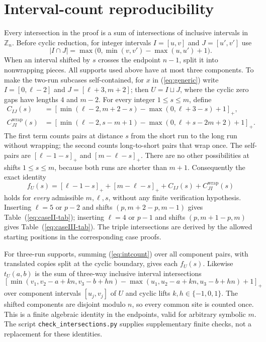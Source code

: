 \documentclass[11pt,a4paper]{article}
\newcommand{\wt}[1]{\lvert #1\rvert}
\newcommand{\cZ}{\mathbb Z}
\newcommand{\pos}[1]{[#1]_{+}}
\begin{document}
\appendix
\section{Interval-count reproducibility}\label{app:intervals}
Every intersection in the proof is a sum of intersections of inclusive intervals in $\cZ_n$. Before cyclic reduction, for integer intervals $I=[u,v]$ and $J=[u',v']$ use
\begin{equation}\label{eq:intcount}
\wt{I\cap J}=\max\big(0,\min(v,v')-\max(u,u')+1\big).
\end{equation}
When an interval shifted by $s$ crosses the endpoint $n-1$, split it into nonwrapping pieces. All supports used above have at most three components. To make the two-run subcases self-contained, for $x$ in (\ref{eq:generic}) write $I=[0,\ell-2]$ and $J=[\ell+3,m+2]$; then $U=I\sqcup J$, where the cyclic zero gaps have lengths $4$ and $m-2$. For every integer $1\le s\le m$, define
\begin{align}
 C_{IJ}(s)&=\pos{\min(\ell-2,m+2-s)-\max(0,\ell+3-s)+1},\\
 C_{JI}^{\mathrm{wrap}}(s)&=\pos{\min(\ell-2,s-m+1)-\max(0,\ell+s-2m+2)+1}.
\end{align}
The first term counts pairs at distance $s$ from the short run to the long run without wrapping; the second counts long-to-short pairs that wrap once. The self-pairs are $\pos{\ell-1-s}$ and $\pos{m-\ell-s}$. There are no other possibilities at shifts $1\le s\le m$, because both runs are shorter than $m+1$. Consequently the exact identity
\begin{equation}\label{eq:generic-f}
 f_U(s)=\pos{\ell-1-s}+\pos{m-\ell-s}+C_{IJ}(s)+C_{JI}^{\mathrm{wrap}}(s)
\end{equation}
holds for \emph{every} admissible $m,\ell,s$, without any finite verification hypothesis. Inserting $\ell=5$ or $p-2$ and shifts $(p,m+2-p,m-1)$ gives Table~(\ref{eq:caseII-tab}); inserting $\ell=4$ or $p-1$ and shifts $(p,m+1-p,m)$ gives Table~(\ref{eq:caseIII-tab}). The triple intersections are derived by the allowed starting positions in the corresponding case proofs.

For three-run supports, summing (\ref{eq:intcount}) over all component pairs, with translated copies split at the cyclic boundary, gives each $f_U(s)$. Likewise $t_U(a,b)$ is the sum of three-way inclusive interval intersections
\[\pos{\min(v_1,v_2-a+kn,v_3-b+hn)-\max(u_1,u_2-a+kn,u_3-b+hn)+1}\]
over component intervals $[u_j,v_j]$ of $U$ and cyclic lifts $k,h\in\{-1,0,1\}$. The shifted components are disjoint modulo $n$, so every common site is counted once. This is a finite algebraic identity in the endpoints, valid for arbitrary symbolic $m$. The script \texttt{check\_intersections.py} supplies supplementary finite checks, not a replacement for these identities.
\end{document}
